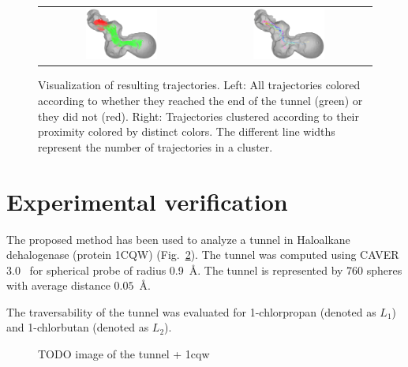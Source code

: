 \documentclass{svmult}
\def\LA{L_1}
\def\LB{L_2}
\begin{document}
\begin{figure}
\centering
\begin{tabular}{cc}
\includegraphics[width=0.45\textwidth]{fig/trajectories-all}
\qquad & \qquad
\includegraphics[width=0.45\textwidth]{fig/trajectories-clustered-21} \\
\end{tabular}
\caption{Visualization of resulting trajectories.
Left: All trajectories colored according to whether they reached the end of the tunnel (green) or they did not (red).
Right: Trajectories clustered according to their proximity colored by distinct colors.
The different line widths represent the number of trajectories in a cluster.}
\label{fig:trajectories}
\end{figure}

\section{Experimental verification}

The proposed method has been used to analyze a tunnel in Haloalkane dehalogenase (protein 1CQW) (Fig.~\ref{fig::tunnel}).
The tunnel was computed using CAVER 3.0~\cite{caver3} for spherical probe of radius 0.9~\AA.
The tunnel is represented by 760 spheres with average distance $0.05$~\AA.

The traversability of the tunnel was evaluated for 1-chlorpropan (denoted as $\LA$) and 1-chlorbutan (denoted as $\LB$).

\begin{figure}
\centering
\caption{\label{fig::tunnel}
    TODO image of the tunnel + 1cqw
}
\end{figure}
\end{document}
